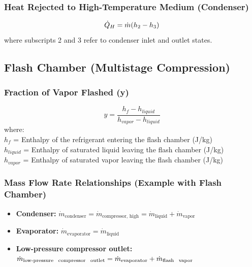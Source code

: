 \subsubsection*{Heat Rejected to High-Temperature Medium (Condenser)}
\begin{equation}
    \dot{Q}_H = \dot{m} (h_2 - h_3)
\end{equation}
where subscripts 2 and 3 refer to condenser inlet and outlet states.

\subsection{Flash Chamber (Multistage Compression)}
\subsubsection*{Fraction of Vapor Flashed (y)}
\begin{equation}
    y = \frac{h_f - h_{liquid}}{h_{vapor} - h_{liquid}}
\end{equation}
where: \\
$h_f$ = Enthalpy of the refrigerant entering the flash chamber (J/kg) \\
$h_{liquid}$ = Enthalpy of saturated liquid leaving the flash chamber (J/kg) \\
$h_{vapor}$ = Enthalpy of saturated vapor leaving the flash chamber (J/kg)

\subsubsection*{Mass Flow Rate Relationships (Example with Flash Chamber)}
\begin{itemize}
    \item \textbf{Condenser:}
    $\dot{m}_{\text{condenser}} = \dot{m}_{\text{compressor, high}} = \dot{m}_{\text{liquid}} + \dot{m}_{\text{vapor}}$

    \item \textbf{Evaporator:}
    $\dot{m}_{\text{evaporator}} = \dot{m}_{\text{liquid}}$

    \item \textbf{Low-pressure compressor outlet:}
    $\dot{m}_{\text{low-pressure \, compressor \, outlet}} = \dot{m}_{\text{evaporator}} + \dot{m}_{\text{flash \, vapor}}$
\end{itemize}
